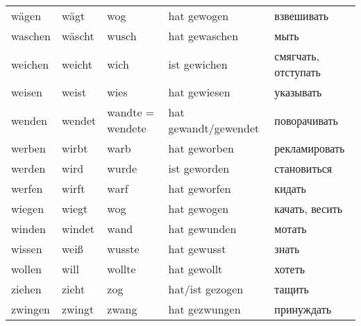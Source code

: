 \begin{longtable}{|l|l|l|l|l|}
w\"agen & w\"agt & wog & hat gewogen & взвешивать \\
waschen & w\"ascht & wusch & hat gewaschen & мыть \\
weichen & weicht & wich & ist gewichen & смягчать, отступать \\
weisen & weist & wies & hat gewiesen & указывать \\
wenden & wendet & wandte = wendete & hat gewandt/gewendet & поворачивать \\
werben & wirbt & warb & hat geworben & рекламировать \\
werden & wird & wurde & ist geworden & становиться \\
werfen & wirft & warf & hat geworfen & кидать \\
wiegen & wiegt & wog & hat gewogen & качать, весить \\
winden & windet & wand & hat gewunden & мотать \\
wissen & wei\ss  & wusste & hat gewusst & знать \\
wollen & will & wollte & hat gewollt & хотеть \\
ziehen & zieht & zog & hat/ist gezogen & тащить \\
zwingen & zwingt & zwang & hat gezwungen & принуждать \\
\hline
\end{longtable}
